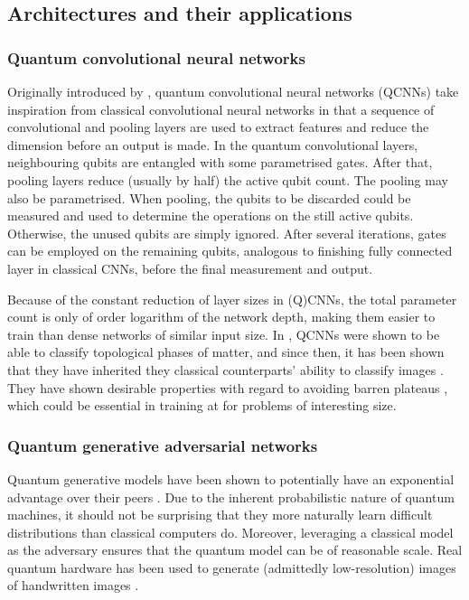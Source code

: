 \subsection{Architectures and their applications}
\subsubsection{Quantum convolutional neural networks}
\label{sec:qcnn}
Originally introduced by \textcite{cong2019}, quantum convolutional neural networks (QCNNs) take inspiration from classical convolutional neural networks in that a sequence of convolutional and pooling layers are used to extract features and reduce the dimension before an output is made.
In the quantum convolutional layers, neighbouring qubits are entangled with some parametrised gates.
After that, pooling layers reduce (usually by half) the active qubit count.
The pooling may also be parametrised.
When pooling, the qubits to be discarded could be measured and used to determine the operations on the still active qubits.
Otherwise, the unused qubits are simply ignored.
After several iterations, gates can be employed on the remaining qubits, analogous to finishing fully connected layer in classical CNNs, before the final measurement and output.

Because of the constant reduction of layer sizes in (Q)CNNs, the total parameter count is only of order logarithm of the network depth, making them easier to train than dense networks of similar input size.
In \cite{cong2019}, QCNNs were shown to be able to classify topological phases of matter, and since then, it has been shown that they have inherited they classical counterparts' ability to classify images \cite{oh2020}.
They have shown desirable properties with regard to avoiding barren plateaus \cite{pesah2021}, which could be essential in training at for problems of interesting size.

\subsubsection{Quantum generative adversarial networks}
Quantum generative models have been shown to potentially have an exponential advantage over their peers \cite{gao2018}.
Due to the inherent probabilistic nature of quantum machines, it should not be surprising that they more naturally learn difficult distributions than classical computers do.
Moreover, leveraging a classical model as the adversary ensures that the quantum model can be of reasonable scale.
Real quantum hardware has been used to generate (admittedly low-resolution) images of handwritten images \cite{huang2021}.

